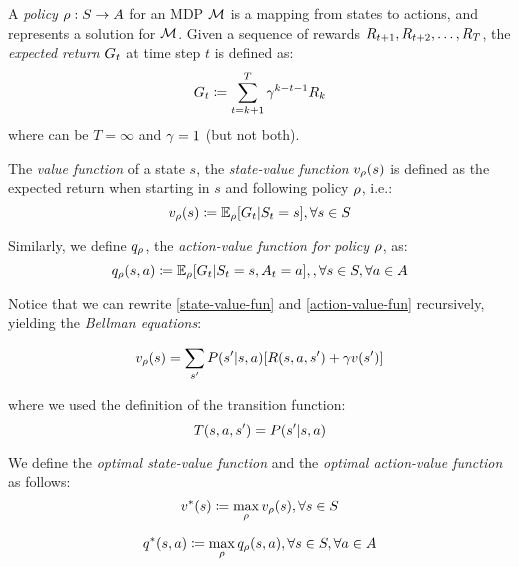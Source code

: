 	A \emph{policy} $\rho: S \to A$ for an MDP $\mathcal{M}$ is a mapping from states to actions, and represents a solution for $\mathcal{M}$. Given a sequence of rewards $R_{t+1}, R_{t+2}, \dots, R_{T}$, the \emph{expected return} $G_t$ at time step $t$
	is defined as: 
	\begin{equation}
		G_t \coloneqq \sum_{t=k+1}^T \gamma^{k-t-1}R_k
	\end{equation} where can be $T = \infty$ and $\gamma = 1$ (but not both). 
	
	The \emph{value function} of a state $s$, the \emph{state-value function} $v_\rho(s)$ is defined as the expected return when starting in $s$ and following policy $\rho$, i.e.:
	\begin{equation}
	\label{state-value-fun}
		v_\rho(s) \coloneqq \mathbb{E}_{\rho}[G_t | S_t = s], \forall s \in S
	\end{equation}
	
	Similarly, we define $q_\rho$, the \emph{action-value function for policy $\rho$}, as:
	\begin{equation}
		\label{action-value-fun}
		q_\rho(s, a) \coloneqq \mathbb{E}_{\rho}[G_t | S_t = s, A_t = a], , \forall s \in S, \forall a \in A
	\end{equation}
	
	Notice that we can rewrite \ref{state-value-fun} and \ref{action-value-fun} recursively, yielding the \emph{Bellman equations}:
	
	\begin{equation}
	\label{bellman-state-value-fun}
	v_\rho(s) =  \sum_{s'} P(s' | s,a)[R(s,a,s') + \gamma v(s')] 
	\end{equation}
	
	where we used the definition of the transition function:
	\begin{equation}
	T(s,a,s') = P(s' | s,a)
	\end{equation}
	
	We define the \emph{optimal state-value function} and the \emph{optimal action-value function} as follows:
	\begin{equation}
	\label{optimal-state-value-fun}
		v^*(s)  \coloneqq \max_\rho  v_\rho(s), \forall s\in S		
	\end{equation}
	
	\begin{equation}
	\label{optimal-action-value-fun}
	q^*(s, a) \coloneqq \max_\rho  q_\rho(s, a), \forall s\in S, \forall a\in A
	\end{equation}
	
